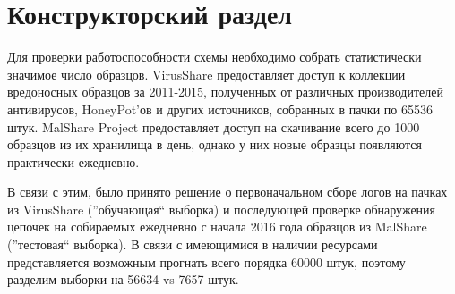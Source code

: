 \section {Конструкторский раздел}
Для проверки работоспособности схемы необходимо собрать статистически значимое число образцов. 
VirusShare \cite{VIRUSSHARE} предоставляет доступ к коллекции вредоносных образцов за 2011-2015, полученных от различных производителей антивирусов, HoneyPot'ов и других источников, собранных в пачки по 65536 штук.
MalShare Project \cite{MALSHARE} предоставляет доступ на скачивание  всего до 1000 образцов из их хранилища в день, однако у них новые образцы появляются практически ежедневно.

В связи с этим, было принято решение о первоначальном сборе логов на пачках из VirusShare (''обучающая`` выборка) и последующей проверке обнаружения цепочек на собираемых ежедневно с начала 2016 года образцов из MalShare (''тестовая`` выборка). В связи с имеющимися в наличии ресурсами представляется возможным прогнать всего порядка 60000 штук, поэтому разделим выборки на 56634 vs 7657 штук.
